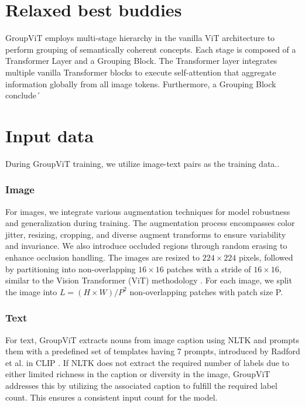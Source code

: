 \section{Relaxed best buddies}
\label{sec:comparison_same_vs_diff_class}
GroupViT employs multi-stage hierarchy in the vanilla ViT architecture to perform grouping of semantically coherent concepts. Each stage is composed of a Transformer Layer and a Grouping Block. The Transformer layer integrates multiple vanilla Transformer blocks \cite{vaswani2017attention}\cite{dosovitskiy2020image} to execute self-attention that aggregate information globally from all image tokens. Furthermore, a Grouping Block conclude´

\section{Input data}
During GroupViT training, we utilize image-text pairs as the training data.. 
\subsubsection{Image} 
\label{sec:inputdata}
For images, we integrate various augmentation techniques for model robustness and generalization during training. The augmentation process encompasses color jitter, resizing, cropping, and diverse augment transforms to ensure variability and invariance. We also introduce occluded regions through random erasing to enhance occlusion handling. 
The images are resized to $224 \times 224$ pixels, followed by partitioning into non-overlapping $16 \times 16$ patches with a stride of $16 \times 16$, similar to the Vision Transformer (ViT) methodology \cite{dosovitskiy2020image}. For each image, we split the image into $L = (H \times W)/P^2$ non-overlapping patches with patch size P.
\subsubsection{Text} 
\label{sec:text_aug}
For text, GroupViT extracts nouns from image caption using NLTK \cite{loper2002nltk} and prompts them with a  predefined set of templates having 7 prompts, introduced by Radford et al. in CLIP \cite{radford2021learning}. If NLTK does not extract the required number of labels due to either limited richness in the caption or diversity in the image, GroupViT addresses this by utilizing the associated caption to fulfill the required label count. This ensures a consistent input count for the model.


